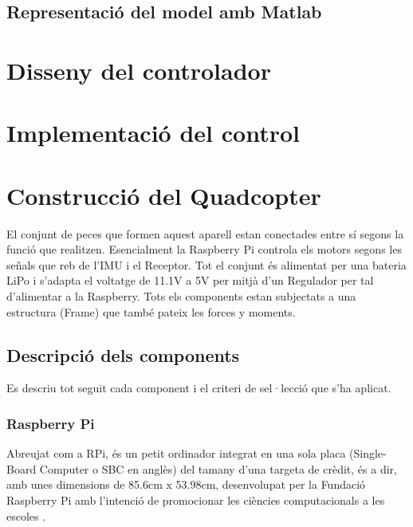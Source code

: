 \documentclass[twoside]{article}
\begin{document}
\newpage
\subsection{Representació del model amb Matlab}

\newpage
\section{Disseny del controlador}
\newpage
\section{Implementació del control} 

\newpage
\section{Construcció del Quadcopter}
El conjunt de peces que formen aquest aparell estan conectades entre sí segons la funció que realitzen. Esencialment la Raspberry Pi controla els motors segons les señals que reb de l'IMU i el Receptor. Tot el conjunt és alimentat per una bateria LiPo i s'adapta el voltatge de 11.1V a 5V per mitjà d'un Regulador per tal d'alimentar a la Raspberry. Tots els components estan subjectats a una estructura (Frame) que també pateix les forces y moments.  

\subsection{Descripció dels components}
Es descriu tot seguit cada component i el criteri de sel·lecció que s'ha aplicat.
\subsubsection*{Raspberry Pi} 
Abreujat com a RPi, és un petit ordinador integrat en una sola placa (Single-Board Computer o SBC en anglès) del tamany d'una targeta de crèdit, és a dir, amb unes dimensions de 85.6cm x 53.98cm, desenvolupat per la Fundació Raspberry Pi amb l'intenció de promocionar les ciències computacionals a les escoles \cite{RPiWiki}. 
\end{document}
